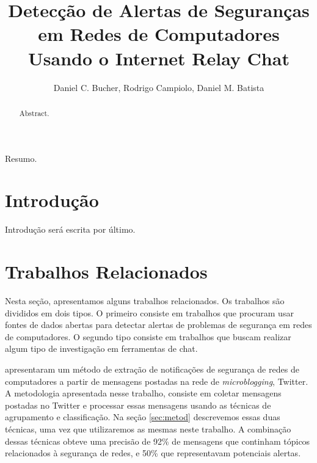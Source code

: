 \documentclass[12pt]{article}
\title{Detecção de Alertas de Seguranças em Redes de Computadores Usando o
Internet Relay Chat}
\author {Daniel C. Bucher\inst{1}, Rodrigo Campiolo\inst{1,2}, Daniel M. Batista\inst{1} }
\begin{document}
\maketitle

\begin{resumo}
  Resumo.


\end{resumo}

\begin{abstract}
  Abstract.


\end{abstract}

\section{Introdução} \label{sec:intro}

Introdução será escrita por último.

\section{Trabalhos Relacionados} \label{sec:rel}

Nesta seção, apresentamos alguns trabalhos relacionados. Os trabalhos são
divididos em dois tipos. O primeiro consiste em trabalhos que procuram usar fontes de
dados abertas para detectar alertas de problemas de segurança em redes de
computadores. O segundo tipo consiste em trabalhos que buscam realizar algum
tipo de investigação em ferramentas de chat.

 apresentaram um método de extração de notificações de
segurança de redes de computadores a partir de mensagens postadas na rede de
\textit{microblogging}, Twitter.
%
A metodologia apresentada nesse trabalho, consiste em coletar mensagens
postadas no Twitter e processar essas mensagens usando as técnicas de
agrupamento e classificação. Na seção \ref{sec:metod} descrevemos essas duas
técnicas, uma vez que utilizaremos as mesmas neste trabalho.
%
A combinação dessas técnicas obteve uma precisão de 92\% de mensagens
que continham tópicos relacionados à segurança de redes, e 50\% que
representavam potenciais alertas.
\end{document}

